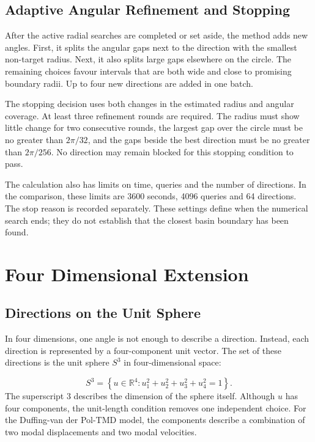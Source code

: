 \subsection{Adaptive Angular Refinement and Stopping}

After the active radial searches are completed or set aside, the method adds new angles. First, it splits the angular gaps next to the direction with the smallest non-target radius. Next, it also splits large gaps elsewhere on the circle. The remaining choices favour intervals that are both wide and close to promising boundary radii. Up to four new directions are added in one batch.

The stopping decision uses both changes in the estimated radius and angular coverage. At least three refinement rounds are required. The radius must show little change for two consecutive rounds, the largest gap over the circle must be no greater than $2\pi/32$, and the gaps beside the best direction must be no greater than $2\pi/256$. No direction may remain blocked for this stopping condition to pass.

The calculation also has limits on time, queries and the number of directions. In the comparison, these limits are 3600 seconds, 4096 queries and 64 directions. The stop reason is recorded separately. These settings define when the numerical search ends; they do not establish that the closest basin boundary has been found.

\clearpage


\section{Four Dimensional Extension}
\subsection{Directions on the Unit Sphere}

\begin{revision}
In four dimensions, one angle is not enough to describe a direction. Instead, each direction is represented by a four-component unit vector. The set of these directions is the unit sphere $S^3$ in four-dimensional space:
\end{revision}
\begin{equation}
 S^3=\left\{u\in\mathbb{R}^4:u_1^2+u_2^2+u_3^2+u_4^2=1\right\}.
\end{equation}
The superscript 3 describes the dimension of the sphere itself. Although $u$ has four components, the unit-length condition removes one independent choice. For the Duffing-van der Pol-TMD model, the components describe a combination of two modal displacements and two modal velocities.

